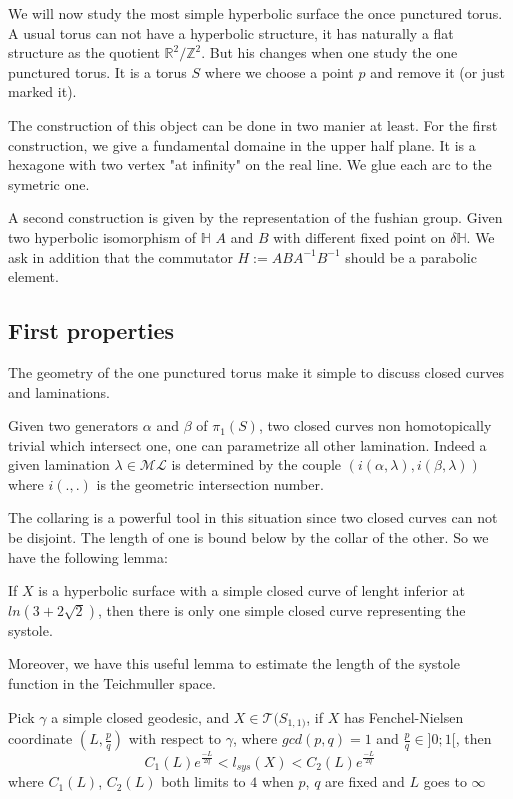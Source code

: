 We will now study the most simple hyperbolic surface the once punctured torus.
A usual torus can not have a hyperbolic structure, it has naturally a flat structure as the quotient $\mathbb{R}^2 / \mathbb{Z}^2$.
But his changes when one study the one punctured torus. It is a torus $S$ where we choose a point $p$ and remove it (or just marked it).


The construction of this object can be done in two manier at least.
For the first construction, we give a fundamental domaine in the upper half plane. It is a hexagone with two vertex "at infinity" on the real line. We glue each arc to the symetric one.



A second construction is given by the representation of the fushian group. Given two hyperbolic isomorphism of $\mathbb{H}$ $A$ and $B$ with different fixed point on $\delta \mathbb{H}$. We ask in addition that the commutator $H := ABA^{-1}B^{-1}$ should be a parabolic element.

\subsection{First properties}

The geometry of the one punctured torus make it simple to discuss closed curves and laminations.
\begin{rmq}
Given two generators $\alpha$ and $\beta$ of $\pi_1(S)$, two closed curves non homotopically trivial which intersect one, one can parametrize all other lamination.
Indeed a given lamination $\lambda \in \mathcal{ML}$ is determined by the couple $(i(\alpha,\lambda),i(\beta,\lambda))$ where $i(.,.)$ is the geometric intersection number.
\end{rmq}

The collaring is a powerful tool in this situation since two closed curves can not be disjoint. The length of one is bound below by the collar of the other. So we have the following lemma:

\begin{lem}
If $X$ is a hyperbolic surface with a simple closed curve of lenght inferior at $ln(3+2 \sqrt{2})$, then there is only one simple closed curve representing the systole.
\end{lem}

Moreover, we have this useful lemma to estimate the length of the systole function in the Teichmuller space.

\begin{lem}
Pick $\gamma$ a simple closed geodesic, and $X \in \mathcal{T}(S_{1,1)}$, if $X$ has Fenchel-Nielsen coordinate $(L,\frac{p}{q})$ with respect to $\gamma$, where $gcd(p,q)=1$ and $\frac{p}{q} \in ]0;1[$, then \[
C_1(L) e^{\frac{-L}{2q}} < l_{sys}(X) < C_2(L) e^{\frac{-L}{2q}}
\]
where $C_1(L)$, $C_2(L)$ both limits to $4$ when $p$, $q$ are fixed and $L$ goes to $\infty$
\end{lem}

